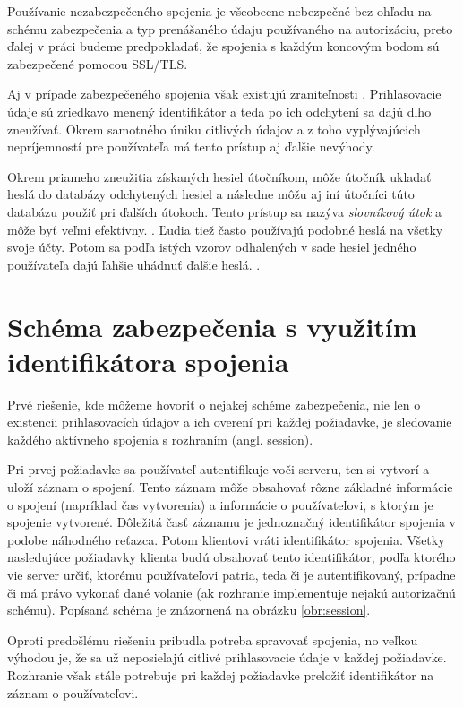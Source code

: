Používanie nezabezpečeného spojenia je všeobecne nebezpečné bez ohľadu na schému zabezpečenia a typ prenášaného údaju používaného na autorizáciu, preto ďalej v práci budeme predpokladať, že spojenia s každým koncovým bodom sú zabezpečené pomocou SSL/TLS.

Aj v prípade zabezpečeného spojenia však existujú zraniteľnosti \cite{tsl_vulnerabilities}. Prihlasovacie údaje sú zriedkavo menený identifikátor a teda po ich odchytení sa dajú dlho zneužívať. Okrem samotného úniku citlivých údajov a z toho vyplývajúcich nepríjemností pre používateľa má tento prístup aj ďalšie nevýhody.

Okrem priameho zneužitia získaných hesiel útočníkom, môže útočník ukladať heslá do databázy odchytených hesiel a následne môžu aj iní útočníci túto databázu použiť pri ďalších útokoch. Tento prístup sa nazýva \textit{slovníkový útok} a môže byť veľmi efektívny. \cite{fast_dict_attacks}. Ľudia tiež často používajú podobné heslá na všetky svoje účty. Potom sa podľa istých vzorov odhalených v sade hesiel jedného používateľa dajú ľahšie uhádnuť ďalšie heslá. \cite{password_patterns}.


\section{Schéma zabezpečenia s využitím identifikátora spojenia}
\label{sec:session}

Prvé riešenie, kde môžeme hovoriť o nejakej schéme zabezpečenia, nie len o existencii prihlasovacích údajov a ich overení pri každej požiadavke, je sledovanie každého aktívneho spojenia s rozhraním (angl. session).

Pri prvej požiadavke sa používateľ autentifikuje voči serveru, ten si vytvorí a uloží záznam o spojení. Tento záznam môže obsahovať rôzne základné informácie o spojení (napríklad čas vytvorenia) a informácie o používateľovi, s ktorým je spojenie vytvorené. Dôležitá časť záznamu je jednoznačný identifikátor spojenia v podobe náhodného reťazca. Potom klientovi vráti identifikátor spojenia. Všetky nasledujúce požiadavky klienta budú obsahovať tento identifikátor, podľa ktorého vie server určiť, ktorému používateľovi patria, teda či je autentifikovaný, prípadne či má právo vykonať dané volanie (ak rozhranie implementuje nejakú autorizačnú schému). Popísaná schéma je znázornená na obrázku \ref{obr:session}.

Oproti predošlému riešeniu pribudla potreba spravovať spojenia, no veľkou výhodou je, že sa už neposielajú citlivé prihlasovacie údaje v každej požiadavke. Rozhranie však stále potrebuje pri každej požiadavke preložiť identifikátor na záznam o používateľovi.


